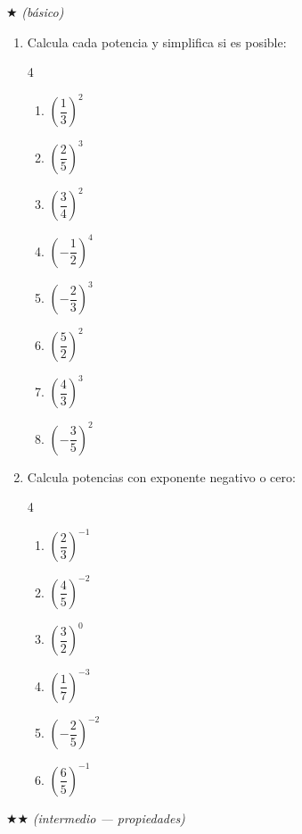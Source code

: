 \documentclass[11pt, letterpaper]{article}
\begin{document}
$\bigstar$ \textit{(b\'asico)}

\begin{enumerate}[label=\textbf{\arabic*.}, leftmargin=*]

\item Calcula cada potencia y simplifica si es posible:
\begin{multicols}{4}
\begin{enumerate}[label=\alph*)]
  \item $\left(\dfrac{1}{3}\right)^2$ \item $\left(\dfrac{2}{5}\right)^3$ \item $\left(\dfrac{3}{4}\right)^2$
  \item $\left(-\dfrac{1}{2}\right)^4$ \item $\left(-\dfrac{2}{3}\right)^3$ \item $\left(\dfrac{5}{2}\right)^2$
  \item $\left(\dfrac{4}{3}\right)^3$ \item $\left(-\dfrac{3}{5}\right)^2$
\end{enumerate}
\end{multicols}

\item Calcula potencias con exponente negativo o cero:
\begin{multicols}{4}
\begin{enumerate}[label=\alph*)]
  \item $\left(\dfrac{2}{3}\right)^{-1}$ \item $\left(\dfrac{4}{5}\right)^{-2}$ \item $\left(\dfrac{3}{2}\right)^{0}$
  \item $\left(\dfrac{1}{7}\right)^{-3}$ \item $\left(-\dfrac{2}{5}\right)^{-2}$ \item $\left(\dfrac{6}{5}\right)^{-1}$
\end{enumerate}
\end{multicols}

\end{enumerate}

$\bigstar\bigstar$ \textit{(intermedio --- propiedades)}
\end{document}
